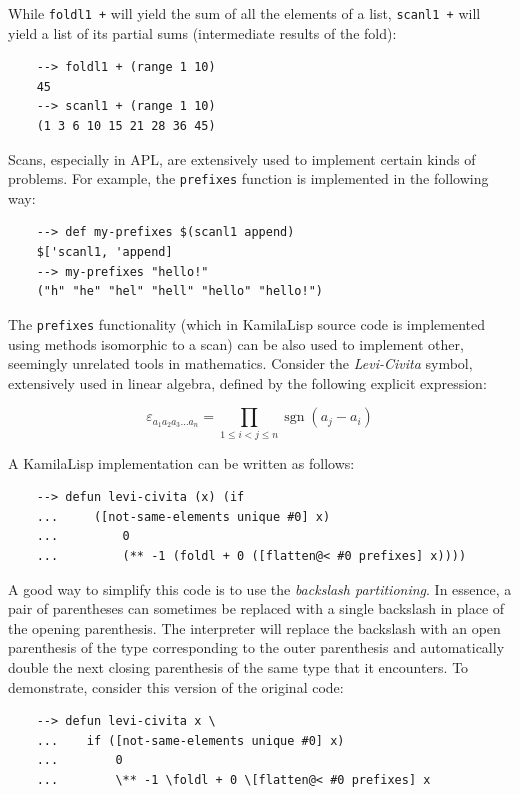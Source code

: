 While \verb|foldl1 +| will yield the sum of all the elements of a list, \verb|scanl1 +| will yield a list of its partial sums (intermediate results of the fold):

\begin{Verbatim}
    --> foldl1 + (range 1 10)
    45
    --> scanl1 + (range 1 10)
    (1 3 6 10 15 21 28 36 45)
\end{Verbatim}

Scans, especially in APL, are extensively used to implement certain kinds of problems. For example, the \verb|prefixes| function is implemented in the following way:

\begin{Verbatim}
    --> def my-prefixes $(scanl1 append)
    $['scanl1, 'append]
    --> my-prefixes "hello!"
    ("h" "he" "hel" "hell" "hello" "hello!")
\end{Verbatim}

The \verb|prefixes| functionality (which in KamilaLisp source code is implemented using methods isomorphic to a scan) can be also used to implement other, seemingly unrelated tools in mathematics. Consider the \textit{Levi-Civita} symbol, extensively used in linear algebra, defined by the following explicit expression:

$$
{\displaystyle \varepsilon _{a_{1}a_{2}a_{3}\ldots a_{n}}=\prod _{1\leq i<j\leq n}\operatorname {sgn}(a_{j}-a_{i})}
$$

A KamilaLisp implementation can be written as follows:

\begin{Verbatim}
    --> defun levi-civita (x) (if
    ...     ([not-same-elements unique #0] x)
    ...         0
    ...         (** -1 (foldl + 0 ([flatten@< #0 prefixes] x))))
\end{Verbatim}

A good way to simplify this code is to use the \textit{backslash partitioning}. In essence, a pair of parentheses can sometimes be replaced with a single backslash in place of the opening parenthesis. The interpreter will replace the backslash with an open parenthesis of the type corresponding to the outer parenthesis and automatically double the next closing parenthesis of the same type that it encounters. To demonstrate, consider this version of the original code:

\begin{Verbatim}
    --> defun levi-civita x \
    ...    if ([not-same-elements unique #0] x)
    ...        0
    ...        \** -1 \foldl + 0 \[flatten@< #0 prefixes] x
\end{Verbatim}

